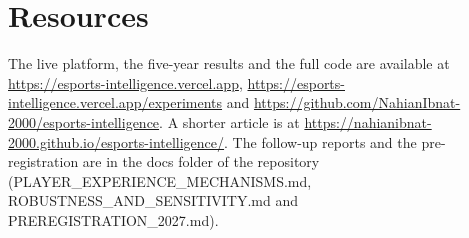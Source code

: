 \documentclass[12pt,a4paper]{article}
\begin{document}
\section*{Resources}
{\raggedright The live platform, the five-year results and the full code are available at \url{https://esports-intelligence.vercel.app}, \url{https://esports-intelligence.vercel.app/experiments} and \url{https://github.com/NahianIbnat-2000/esports-intelligence}. A shorter article is at \url{https://nahianibnat-2000.github.io/esports-intelligence/}. The follow-up reports and the pre-registration are in the docs folder of the repository (PLAYER\_EXPERIENCE\_MECHANISMS.md, ROBUSTNESS\_AND\_SENSITIVITY.md and PREREGISTRATION\_2027.md).\par}

\clearpage
\renewcommand{\bibsection}{\begin{center}\large\bfseries References\end{center}\vspace{0.3em}}
\setlength{\bibhang}{0.5in}
\end{document}

